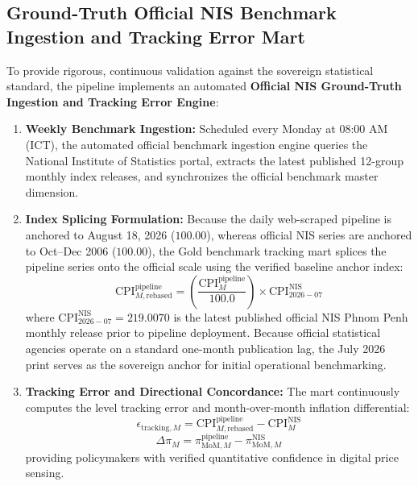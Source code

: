 \subsection{Ground-Truth Official NIS Benchmark Ingestion and Tracking Error Mart}
\hs To provide rigorous, continuous validation against the sovereign statistical standard, the pipeline implements an automated \textbf{Official NIS Ground-Truth Ingestion and Tracking Error Engine}:
\begin{enumerate}
    \item \textbf{Weekly Benchmark Ingestion:} Scheduled every Monday at 08:00 AM (ICT), the automated official benchmark ingestion engine queries the National Institute of Statistics portal, extracts the latest published 12-group monthly index releases, and synchronizes the official benchmark master dimension.
    \item \textbf{Index Splicing Formulation:} Because the daily web-scraped pipeline is anchored to August 18, 2026 ($100.00$), whereas official NIS series are anchored to Oct--Dec 2006 ($100.00$), the Gold benchmark tracking mart splices the pipeline series onto the official scale using the verified baseline anchor index:
    \begin{equation}
        \text{CPI}_{M, \text{rebased}}^{\text{pipeline}} = \left( \frac{\text{CPI}_M^{\text{pipeline}}}{100.0} \right) \times \text{CPI}_{2026-07}^{\text{NIS}}
    \end{equation}
    where $\text{CPI}_{2026-07}^{\text{NIS}} = 219.0070$ is the latest published official NIS Phnom Penh monthly release prior to pipeline deployment. Because official statistical agencies operate on a standard one-month publication lag, the July 2026 print serves as the sovereign anchor for initial operational benchmarking.
    \item \textbf{Tracking Error and Directional Concordance:} The mart continuously computes the level tracking error and month-over-month inflation differential:
    \begin{equation}
        \epsilon_{\text{tracking}, M} = \text{CPI}_{M, \text{rebased}}^{\text{pipeline}} - \text{CPI}_M^{\text{NIS}}
    \end{equation}
    \begin{equation}
        \Delta \pi_M = \pi_{\text{MoM}, M}^{\text{pipeline}} - \pi_{\text{MoM}, M}^{\text{NIS}}
    \end{equation}
    providing policymakers with verified quantitative confidence in digital price sensing.
\end{enumerate}

